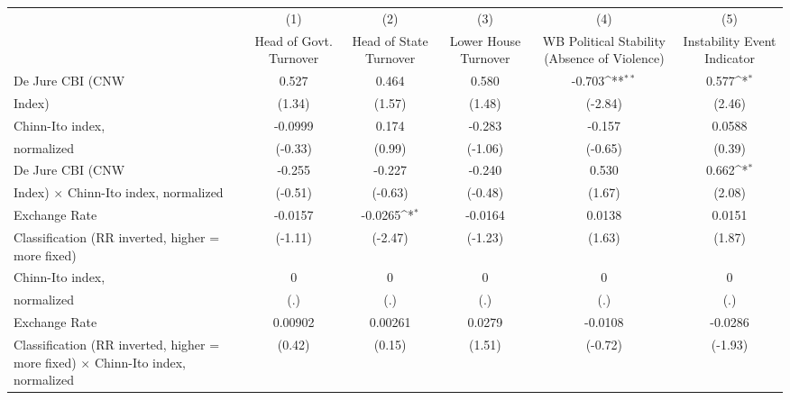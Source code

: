 {
\def\sym#1{\ifmmode^{#1}\else\(^{#1}\)\fi}
\begin{tabular}{l*{5}{c}}
\toprule
                &\multicolumn{1}{c}{(1)}&\multicolumn{1}{c}{(2)}&\multicolumn{1}{c}{(3)}&\multicolumn{1}{c}{(4)}&\multicolumn{1}{c}{(5)}\\
                &\multicolumn{1}{c}{Head of Govt. Turnover}&\multicolumn{1}{c}{Head of State Turnover}&\multicolumn{1}{c}{Lower House Turnover}&\multicolumn{1}{c}{WB Political Stability (Absence of Violence)}&\multicolumn{1}{c}{Instability Event Indicator}\\
\midrule
De Jure CBI (CNW&    0.527         &    0.464         &    0.580         &   -0.703\sym{**} &    0.577\sym{*}  \\
Index)          &   (1.34)         &   (1.57)         &   (1.48)         &  (-2.84)         &   (2.46)         \\
\addlinespace
Chinn-Ito index,&  -0.0999         &    0.174         &   -0.283         &   -0.157         &   0.0588         \\
normalized      &  (-0.33)         &   (0.99)         &  (-1.06)         &  (-0.65)         &   (0.39)         \\
\addlinespace
De Jure CBI (CNW&   -0.255         &   -0.227         &   -0.240         &    0.530         &    0.662\sym{*}  \\
Index) $\times$ Chinn-Ito index, normalized&  (-0.51)         &  (-0.63)         &  (-0.48)         &   (1.67)         &   (2.08)         \\
\addlinespace
Exchange Rate   &  -0.0157         &  -0.0265\sym{*}  &  -0.0164         &   0.0138         &   0.0151         \\
Classification (RR inverted, higher = more fixed)&  (-1.11)         &  (-2.47)         &  (-1.23)         &   (1.63)         &   (1.87)         \\
\addlinespace
Chinn-Ito index,&        0         &        0         &        0         &        0         &        0         \\
normalized      &      (.)         &      (.)         &      (.)         &      (.)         &      (.)         \\
\addlinespace
Exchange Rate   &  0.00902         &  0.00261         &   0.0279         &  -0.0108         &  -0.0286         \\
Classification (RR inverted, higher = more fixed) $\times$ Chinn-Ito index, normalized&   (0.42)         &   (0.15)         &   (1.51)         &  (-0.72)         &  (-1.93)         \\

\end{tabular}}
